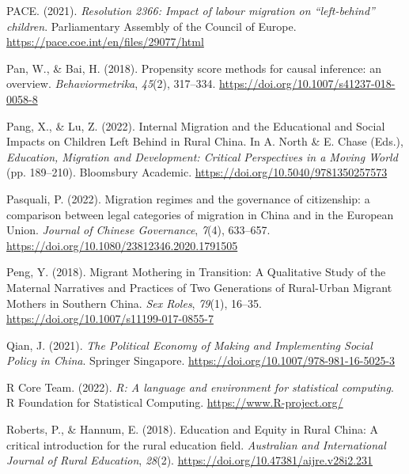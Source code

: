 \documentclass[
  man,floatsintext]{apa7}
\newlength{\cslhangindent}
\newlength{\cslentryspacingunit} %
\newenvironment{CSLReferences}[2] %
 {%
  \setlength{\parindent}{0pt}
  \ifodd #1
  \let\oldpar\par
  \def\par{\hangindent=\cslhangindent\oldpar}
  \fi
  \setlength{\parskip}{#2\cslentryspacingunit}
 }%
 {}
\begin{document}
\begin{CSLReferences}{1}{0}
\leavevmode{}%
PACE. (2021). \emph{Resolution 2366: Impact of labour migration on {``}left-behind{''} children}. Parliamentary Assembly of the Council of Europe. \url{https://pace.coe.int/en/files/29077/html}

\leavevmode{}%
Pan, W., \& Bai, H. (2018). Propensity score methods for causal inference: an overview. \emph{Behaviormetrika}, \emph{45}(2), 317--334. \url{https://doi.org/10.1007/s41237-018-0058-8}

\leavevmode{}%
Pang, X., \& Lu, Z. (2022). Internal Migration and the Educational and Social Impacts on Children Left Behind in Rural {China}. In A. North \& E. Chase (Eds.), \emph{Education, Migration and Development: Critical Perspectives in a Moving World} (pp. 189--210). Bloomsbury Academic. \url{https://doi.org/10.5040/9781350257573}

\leavevmode{}%
Pasquali, P. (2022). Migration regimes and the governance of citizenship: a comparison between legal categories of migration in {China} and in the European Union. \emph{Journal of Chinese Governance}, \emph{7}(4), 633--657. \url{https://doi.org/10.1080/23812346.2020.1791505}

\leavevmode{}%
Peng, Y. (2018). Migrant Mothering in Transition: A Qualitative Study of the Maternal Narratives and Practices of Two Generations of Rural-Urban Migrant Mothers in Southern {China}. \emph{Sex Roles}, \emph{79}(1), 16--35. \url{https://doi.org/10.1007/s11199-017-0855-7}

\leavevmode{}%
Qian, J. (2021). \emph{The Political Economy of Making and Implementing Social Policy in {China}}. Springer Singapore. \url{https://doi.org/10.1007/978-981-16-5025-3}

\leavevmode{}%
R Core Team. (2022). \emph{R: A language and environment for statistical computing}. R Foundation for Statistical Computing. \url{https://www.R-project.org/}

\leavevmode{}%
Roberts, P., \& Hannum, E. (2018). Education and Equity in Rural {China}: A critical introduction for the rural education field. \emph{Australian and International Journal of Rural Education}, \emph{28}(2). \url{https://doi.org/10.47381/aijre.v28i2.231}


\end{CSLReferences}
\end{document}
